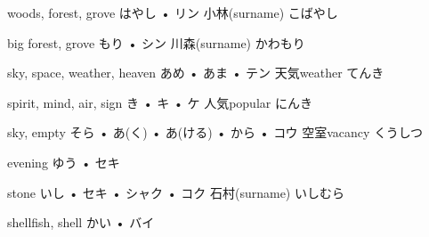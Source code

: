 



\setcounter{cardnum}{25}

		{woods, forest, grove}
		{はやし • リン}
		{小林}{(surname) こばやし}
		{}{}
		{}{}
		{}{}
		{}{}

		{big forest, grove}
		{もり • シン}
		{川森}{(surname) かわもり}
		{}{}
		{}{}
		{}{}
		{}{}

		{sky, space, weather, heaven}
		{あめ • あま • テン}
		{天気}{weather てんき}
		{}{}
		{}{}
		{}{}
		{}{}

		{spirit, mind, air, sign}
		{き • キ • ケ}
		{人気}{popular にんき}
		{}{}
		{}{}
		{}{}
		{}{}

		{sky, empty}
		{そら • あ(く) • あ(ける) • から • コウ}
		{空室}{vacancy くうしつ}
		{}{}
		{}{}
		{}{}
		{}{}

		{evening}
		{ゆう • セキ}
		{}{}
		{}{}
		{}{}
		{}{}
		{}{}

		{stone}
		{いし • セキ • シャク • コク}
		{石村}{(surname) いしむら}
		{}{}
		{}{}
		{}{}
		{}{}

		{shellfish, shell}
		{かい • バイ}
		{}{}
		{}{}
		{}{}
		{}{}
		{}{}

